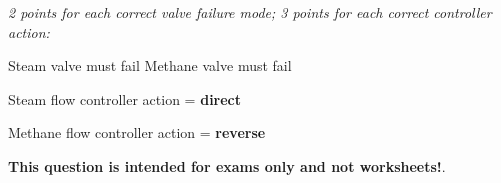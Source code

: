 
{\it 2 points for each correct valve failure mode; 3 points for each correct controller action:}

\vskip 10pt

Steam valve must fail  \hskip 100pt Methane valve must fail 

\vskip 10pt

Steam flow controller action = {\bf direct}

\vskip 10pt

Methane flow controller action = {\bf reverse}







{\bf This question is intended for exams only and not worksheets!}.



